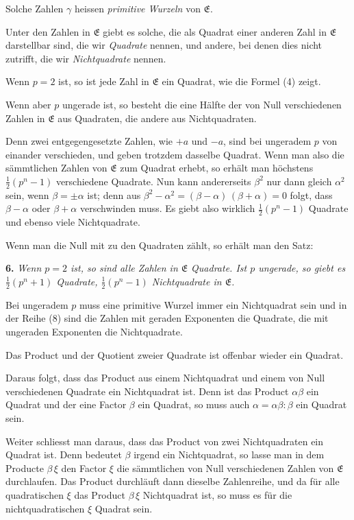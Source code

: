 \documentclass[12pt,a4paper]{article}
\begin{document}
Solche Zahlen $\gamma$ heissen \emph{primitive Wurzeln} von $\mathfrak{E}$.

Unter den Zahlen in $\mathfrak{E}$ giebt es solche, die als Quadrat einer anderen Zahl in $\mathfrak{E}$ darstellbar sind, die wir \emph{Quadrate} nennen, und andere, bei denen dies nicht zutrifft, die wir \emph{Nichtquadrate} nennen.

Wenn $p = 2$ ist, so ist jede Zahl in $\mathfrak{E}$ ein Quadrat, wie die Formel (4) zeigt.

Wenn aber $p$ ungerade ist, so besteht die eine Hälfte der von Null verschiedenen Zahlen in $\mathfrak{E}$ aus Quadraten, die andere aus Nichtquadraten.

Denn zwei entgegengesetzte Zahlen, wie $+a$ und $-a$, sind bei ungeradem $p$ von einander verschieden, und geben trotzdem dasselbe Quadrat. Wenn man also die sämmtlichen Zahlen von $\mathfrak{E}$ zum Quadrat erhebt, so erhält man höchstens $\frac{1}{2}(p^{n} - 1)$ verschiedene Quadrate. Nun kann andererseits $\beta^{2}$ nur dann gleich $\alpha^{2}$ sein, wenn $\beta = \pm\alpha$ ist; denn aus $\beta^{2} - \alpha^{2} = (\beta - \alpha)\,(\beta + \alpha) = 0$ folgt, dass $\beta - \alpha$ oder $\beta + \alpha$ verschwinden muss. Es giebt also wirklich $\frac{1}{2}(p^{n} - 1)$ Quadrate und ebenso viele Nichtquadrate.

Wenn man die Null mit zu den Quadraten zählt, so erhält man den Satz:

\medskip\noindent
\textbf{6.} \emph{Wenn $p = 2$ ist, so sind alle Zahlen in $\mathfrak{E}$ Quadrate. Ist $p$ ungerade, so giebt es $\frac{1}{2}(p^{n} + 1)$ Quadrate, $\frac{1}{2}(p^{n} - 1)$ Nichtquadrate in $\mathfrak{E}$.}

Bei ungeradem $p$ muss eine primitive Wurzel immer ein Nichtquadrat sein und in der Reihe (8) sind die Zahlen mit geraden Exponenten die Quadrate, die mit ungeraden Exponenten die Nichtquadrate.

Das Product und der Quotient zweier Quadrate ist offenbar wieder ein Quadrat.

Daraus folgt, dass das Product aus einem Nichtquadrat und einem von Null verschiedenen Quadrate ein Nichtquadrat ist. Denn ist das Product $\alpha\beta$ ein Quadrat und der eine Factor $\beta$ ein Quadrat, so muss auch $\alpha = \alpha\beta : \beta$ ein Quadrat sein.

Weiter schliesst man daraus, dass das Product von zwei Nichtquadraten ein Quadrat ist. Denn bedeutet $\beta$ irgend ein Nichtquadrat, so lasse man in dem Producte $\beta\,\xi$ den Factor $\xi$ die sämmtlichen von Null verschiedenen Zahlen von $\mathfrak{E}$ durchlaufen. Das Product durchläuft dann dieselbe Zahlenreihe, und da für alle quadratischen $\xi$ das Product $\beta\,\xi$ Nichtquadrat ist, so muss es für die nichtquadratischen $\xi$ Quadrat sein.
\end{document}
